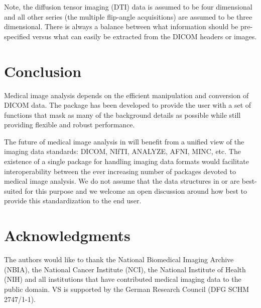 \documentclass[article,nojss,shortnames]{jss}
\begin{document}
Note, the diffusion tensor imaging (DTI) data  is
assumed to be four dimensional and all other series (the multiple
flip-angle acquisitions) are assumed to be three dimensional.  There
is always a balance between what information should be pre-specified
versus what can easily be extracted from the DICOM headers or images.

\section{Conclusion}

Medical image analysis depends on the efficient manipulation and
conversion of DICOM data.  The  package has been
developed to provide the user with a set of functions that mask as
many of the background details as possible while still providing
flexible and robust performance.

The future of medical image analysis in  will benefit from
a unified view of the imaging data standards: DICOM, NIfTI, ANALYZE,
AFNI, MINC, etc.  The existence of a single package for handling
imaging data formats would facilitate interoperability between the
ever increasing number of  packages devoted to medical
image analysis.  We do not assume that the data structures in
 or  are best-suited for this purpose
and we welcome an open discussion around how best to provide this
standardization to the end user.

\section*{Acknowledgments}

The authors would like to thank the National Biomedical Imaging
Archive (NBIA), the National Cancer Institute (NCI), the National
Institute of Health (NIH) and all institutions that have contributed
medical imaging data to the public domain.  VS is supported by the
German Research Council (DFG SCHM 2747/1-1).


\end{document}
